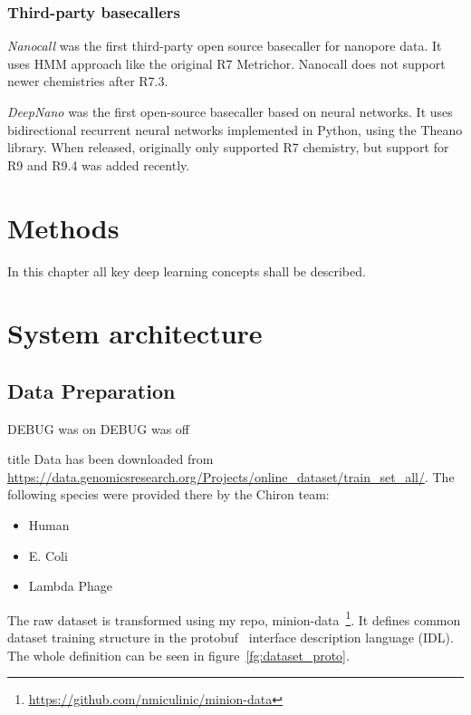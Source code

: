 \documentclass[times, utf8, diplomski, english]{fer}
\begin{document}
\pagebreak
\subsection{Third-party basecallers}

\textit{Nanocall} \cite{David046086} was the first third-party open source basecaller for nanopore data. It uses HMM approach like the original R7 Metrichor. Nanocall does not support newer chemistries after R7.3.


\textit{DeepNano} \cite{Boza2017}  was the first open-source basecaller based on neural networks. It uses bidirectional recurrent neural networks implemented in Python, using the Theano library. When released, originally only supported R7 chemistry, but support for R9 and R9.4 was added recently.

\chapter{Methods}
In this chapter all key deep learning concepts shall be described. 

\chapter{System architecture}
\section{Data Preparation}

\ifdefined\DEBUG
    DEBUG was on
\else
   DEBUG was off
\fi

title
Data has been downloaded from \url{https://data.genomicsresearch.org/Projects/online_dataset/train_set_all/}.  The following species were provided there by the Chiron team:
\begin{itemize}
    \item Human
    \item E. Coli
    \item Lambda Phage
\end{itemize}

The raw dataset is transformed using my repo, minion-data~\footnote{\url{https://github.com/nmiculinic/minion-data}}. It defines common dataset training structure in the protobuf~\citep{protobuf} interface description language (IDL). The whole definition can be seen in figure~\ref{fg:dataset_proto}.
\end{document}
